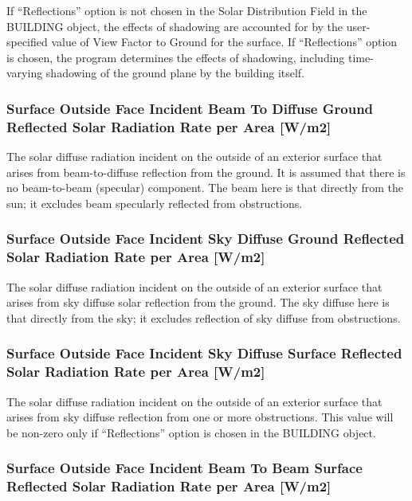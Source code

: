 If ``Reflections'' option is not chosen in the Solar Distribution Field in the BUILDING object, the effects of shadowing are accounted for by the user-specified value of View Factor to Ground for the surface. If ``Reflections'' option is chosen, the program determines the effects of shadowing, including time-varying shadowing of the ground plane by the building itself.

\subsubsection{Surface Outside Face Incident Beam To Diffuse Ground Reflected Solar Radiation Rate per Area {[}W/m2{]}}\label{surface-outside-face-incident-beam-to-diffuse-ground-reflected-solar-radiation-rate-per-area-wm2}

The solar diffuse radiation incident on the outside of an exterior surface that arises from beam-to-diffuse reflection from the ground. It is assumed that there is no beam-to-beam (specular) component. The beam here is that directly from the sun; it excludes beam specularly reflected from obstructions.

\subsubsection{Surface Outside Face Incident Sky Diffuse Ground Reflected Solar Radiation Rate per Area {[}W/m2{]}}\label{surface-outside-face-incident-sky-diffuse-ground-reflected-solar-radiation-rate-per-area-wm2}

The solar diffuse radiation incident on the outside of an exterior surface that arises from sky diffuse solar reflection from the ground. The sky diffuse here is that directly from the sky; it excludes reflection of sky diffuse from obstructions.

\subsubsection{Surface Outside Face Incident Sky Diffuse Surface Reflected Solar Radiation Rate per Area {[}W/m2{]}}\label{surface-outside-face-incident-sky-diffuse-surface-reflected-solar-radiation-rate-per-area-wm2}

The solar diffuse radiation incident on the outside of an exterior surface that arises from sky diffuse reflection from one or more obstructions. This value will be non-zero only if ``Reflections'' option is chosen in the BUILDING object.

\subsubsection{Surface Outside Face Incident Beam To Beam Surface Reflected Solar Radiation Rate per Area {[}W/m2{]}}\label{surface-outside-face-incident-beam-to-beam-surface-reflected-solar-radiation-rate-per-area-wm2}

